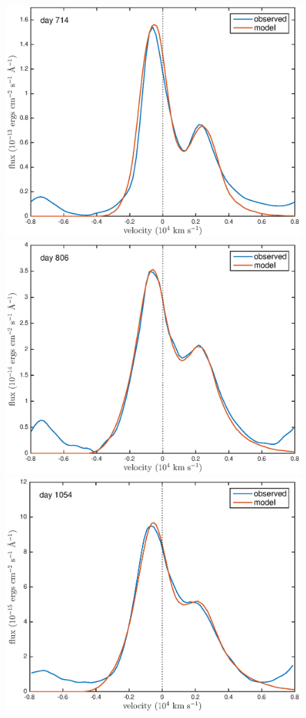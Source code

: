 \documentclass[useAMS,usenatbib,usegraphicx]{mnras}
\begin{document}
\begin{figure}
\begin{center}
\includegraphics[trim =33 10 45 15,clip=true,scale=0.47]{clump_1/maximum/d714OI_ext}
\includegraphics[trim =33 10 45 15,clip=true,scale=0.47]{clump_1/maximum/d806OI_ext}
\includegraphics[trim =33 10 45 15,clip=true,scale=0.47]{clump_1/maximum/d1054OI}

\end{center}
\end{figure}
\end{document}
